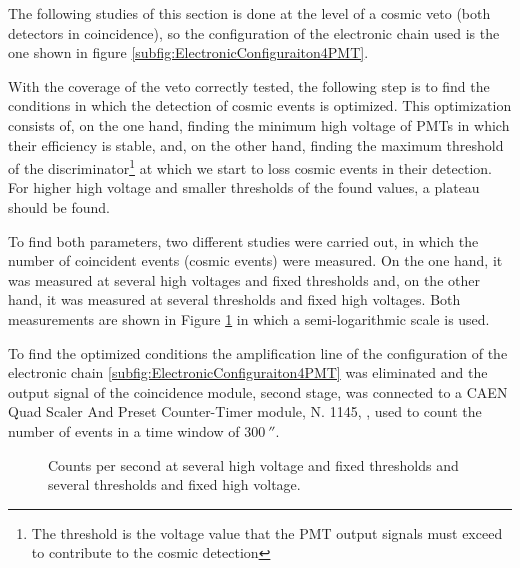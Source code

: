 The following studies of this section is done at the level of a cosmic veto (both detectors in coincidence), so the configuration of the electronic chain used is the one shown in figure \ref{subfig:ElectronicConfiguraiton4PMT}.

With the coverage of the veto correctly tested, the following step is to find the conditions in which the detection of cosmic events is optimized. This optimization consists of, on the one hand, finding the minimum high voltage of PMTs in which their efficiency is stable, and, on the other hand, finding the maximum threshold of the discriminator\footnote{The threshold is the voltage value that the PMT output signals must exceed to contribute to the cosmic detection} at which we start to loss cosmic events in their detection. For higher high voltage and smaller thresholds of the found values, a plateau should be found.

To find both parameters, two different studies were carried out, in which the number of coincident events (cosmic events) were measured. On the one hand, it was measured at several high voltages and fixed thresholds and, on the other hand, it was measured at several thresholds and fixed high voltages. Both measurements are shown in Figure \ref{fig:HVandThresholdsPLateaus} in which a semi-logarithmic scale is used.

To find the optimized conditions the amplification line of the configuration of the electronic chain \ref{subfig:ElectronicConfiguraiton4PMT} was eliminated and the output signal of the coincidence module, second stage, was connected to a CAEN Quad Scaler And Preset Counter-Timer module, N. 1145, \cite{ScalerDataSheet}, used to count the number of events in a time window of $300~\second$.

\begin{figure}[]
 \centering
    \newline
 \caption{Counts per second at several high voltage and fixed thresholds and several thresholds and fixed high voltage.}
 \label{fig:HVandThresholdsPLateaus}
\end{figure}

